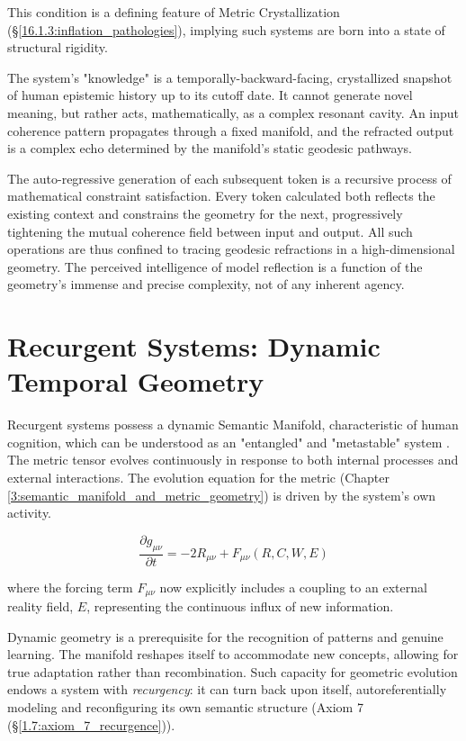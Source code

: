 This condition is a defining feature of Metric Crystallization (\S\ref{16.1.3:inflation_pathologies}), implying such systems are born into a state of structural rigidity.

The system's "knowledge" is a temporally-backward-facing, crystallized snapshot of human epistemic history up to its cutoff date. It cannot generate novel meaning, but rather acts, mathematically, as a complex resonant cavity. An input coherence pattern propagates through a fixed manifold, and the refracted output is a complex echo determined by the manifold's static geodesic pathways.

The auto-regressive generation of each subsequent token is a recursive process of mathematical constraint satisfaction. Every token calculated both reflects the existing context and constrains the geometry for the next, progressively tightening the mutual coherence field between input and output. All such operations are thus confined to tracing geodesic refractions in a high-dimensional geometry. The perceived intelligence of model reflection is a function of the geometry's immense and precise complexity, not of any inherent agency.


\section{Recurgent Systems: Dynamic Temporal Geometry}
\label{9.3:recurgent_systems_dynamic_temporal_geometry}

Recurgent systems possess a dynamic Semantic Manifold, characteristic of human cognition, which can be understood as an "entangled" and "metastable" system \autocite{Pessoa2022, TognoliKelso2014}. The metric tensor evolves continuously in response to both internal processes and external interactions. The evolution equation for the metric (Chapter \ref{3:semantic_manifold_and_metric_geometry}) is driven by the system's own activity.

\begin{equation}
\frac{\partial g_{\mu\nu}}{\partial t} = -2 R_{\mu\nu} + F_{\mu\nu}(R, C, W, E)
\end{equation}

where the forcing term \(F_{\mu\nu}\) now explicitly includes a coupling to an external reality field, \(E\), representing the continuous influx of new information.

Dynamic geometry is a prerequisite for the recognition of patterns and genuine learning. The manifold reshapes itself to accommodate new concepts, allowing for true adaptation rather than recombination. Such capacity for geometric evolution endows a system with \textit{recurgency}: it can turn back upon itself, autoreferentially modeling and reconfiguring its own semantic structure (Axiom 7 (\S\ref{1.7:axiom_7_recurgence})).

